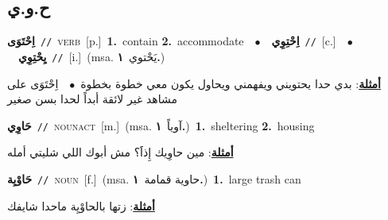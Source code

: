 \documentclass[10pt,a4paper,twoside]{article} %
\begin{document}
\begin{multicols}{2}
\vspace{-3mm}
\subsection*{\color{blue}\foreignlanguage{arabic}{ح.و.ي}\color{blue}{}} 

{\setlength\topsep{0pt}\textbf{\foreignlanguage{arabic}{اِحْتَوَى}}\ {\color{gray}\texttt{//}\color{black}}\ \textsc{verb}\ [p.]\ \textbf{1.}~contain  \textbf{2.}~accommodate\ \ $\bullet$\ \ \setlength\topsep{0pt}\textbf{\foreignlanguage{arabic}{اِحْتِوِي}}\ {\color{gray}\texttt{//}\color{black}}\ [c.]\ \ $\bullet$\ \ \setlength\topsep{0pt}\textbf{\foreignlanguage{arabic}{يِحْتِوِي}}\ {\color{gray}\texttt{//}\color{black}}\ [i.]\ \color{gray}(msa. \foreignlanguage{arabic}{يَحْتوي}~\foreignlanguage{arabic}{\textbf{١.}})\color{black}\  \begin{flushright}\color{gray}\foreignlanguage{arabic}{\textbf{\underline{\foreignlanguage{arabic}{أمثلة}}}: بدي حدا يحتويني ويفهمني ويحاول يكون معي خطوة بخطوة\ $\bullet$\ \  اِحْتَوَى على مشاهد غير لائقة أبداً لحدا بسن صغير}\end{flushright}\color{black}} \vspace{2mm}

{\setlength\topsep{0pt}\textbf{\foreignlanguage{arabic}{حَاوِي}}\ {\color{gray}\texttt{//}\color{black}}\ \textsc{noun\textunderscore act}\ [m.]\ \color{gray}(msa. \foreignlanguage{arabic}{آوياً}~\foreignlanguage{arabic}{\textbf{١.}})\color{black}\ \textbf{1.}~sheltering  \textbf{2.}~housing\  \begin{flushright}\color{gray}\foreignlanguage{arabic}{\textbf{\underline{\foreignlanguage{arabic}{أمثلة}}}: مين حاوِيك إِذاََ؟ مش أبوك اللي شليتي أمله}\end{flushright}\color{black}} \vspace{2mm}

{\setlength\topsep{0pt}\textbf{\foreignlanguage{arabic}{حَاوْيِة}}\ {\color{gray}\texttt{//}\color{black}}\ \textsc{noun}\ [f.]\ \color{gray}(msa. \foreignlanguage{arabic}{حاوية قمامة}~\foreignlanguage{arabic}{\textbf{١.}})\color{black}\ \textbf{1.}~large trash can\  \begin{flushright}\color{gray}\foreignlanguage{arabic}{\textbf{\underline{\foreignlanguage{arabic}{أمثلة}}}: زتها بالحاوْيِة ماحدا شايفك}\end{flushright}\color{black}} \vspace{2mm}


\end{multicols}
\end{document}
